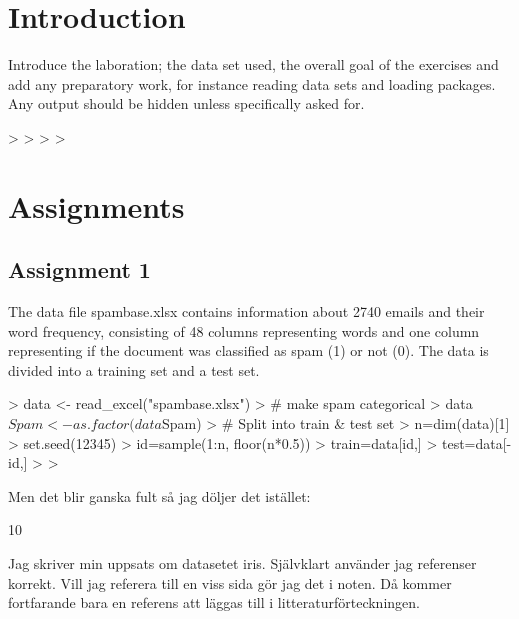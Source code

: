 \documentclass[10pt,swedish, openany]{book}
\begin{document}
\chapter{Introduction}
Introduce the laboration; the data set used, the overall goal of the exercises and add any preparatory work, for instance reading data sets and loading packages. Any output should be hidden unless specifically asked for.

\begin{Schunk}
\begin{Sinput}
> 
> 
> 
> 
\end{Sinput}
\end{Schunk}

\chapter{Assignments}

\section{Assignment 1}

The data file spambase.xlsx contains information about 2740 emails and their word frequency, consisting of 48 columns representing words and one column representing if the document was classified as spam (1) or not (0). The data is divided into a training set and a test set.  


\begin{Schunk}
\begin{Sinput}
> data <- read_excel("spambase.xlsx")
> # make spam categorical
> data$Spam <- as.factor(data$Spam)
> # Split into train & test set
> n=dim(data)[1] 
> set.seed(12345)  
> id=sample(1:n, floor(n*0.5))  
> train=data[id,]  
> test=data[-id,]  
> 
> 
\end{Sinput}
\end{Schunk}
Men det blir ganska fult så jag döljer det istället:
\begin{Schunk}
\begin{Soutput}
[1] 10
\end{Soutput}
\end{Schunk}

Jag skriver min uppsats om datasetet iris.\cite{anderson1935irises} Självklart använder jag referenser korrekt. Vill jag referera till en viss sida gör jag det i noten. \cite[s. 2-4]{anderson1935irises} Då kommer fortfarande bara en referens att läggas till i litteraturförteckningen.
\end{document}
